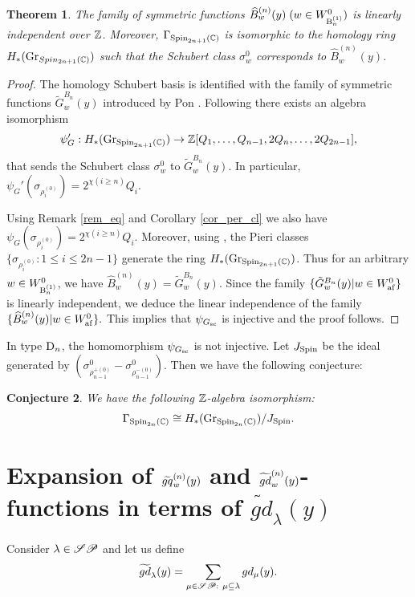 \documentclass[a4paper]{amsart}
\newtheorem{thm}{Theorem}[section]
\newtheorem{conj}[thm]{Conjecture}
\theoremstyle{remark}
\numberwithin{equation}{section}
\begin{document}
\begin{thm}\label{thm_hom_eq}
The family of symmetric functions
${\widehat{B}}_{w}^{(n)}(y)\;(w\in \WBgr{n})$ is linearly independent
over $\Z$. Moreover, $\Gamma_{\Spin_{2n+1}(\C)}$ is isomorphic to the
homology ring $H_*(\Gr_{Spin_{2n+1}(\C)})$
such that the Schubert class $\sigma_{w}^0$
corresponds to ${\widehat{B}}_{w}^{(n)}(y)$.
 \end{thm}
\begin{proof}
The homology Schubert basis 
 is identified with the family of symmetric functions
 $\tilde{G}_w^{B_n}(y)$ introduced by Pon \cite[Section 2.2]{Pon}. Following \cite[Theorem 2.5]{Pon} there exists an algebra isomorphism 
$$\psi_G': H_*(\Gr_{\Spin_{2n+1}(\C)})\to \Z[Q_1,\dots,Q_{n-1},2Q_n,\dots,2Q_{2n-1}],$$
that sends the Schubert class $\sigma_w^0$ to $\tilde{G}_w^{B_n}(y)$. In particular, $\psi_G'(\sigma_{\rho_i^{(0)}})=2^{\chi(i\ge n)}Q_i$. 

Using Remark \ref{rem_eq} and Corollary \ref{cor_per_cl} we also have $\psi_G(\sigma_{\rho_i^{(0)}})=2^{\chi(i\ge n)}Q_i$. Moreover, using \cite[Theorem 2.5]{Pon}, the Pieri classes $\{\sigma_{\rho_i^{(0)}}: 1\le i\le 2n-1\}$ generate the ring $H_*(\Gr_{\Spin_{2n+1}(\C)})$. Thus for an arbitrary $w\in \WBgr{n}$, we have ${\widehat{B}}_w^{(n)}(y)=\tilde{G}_w^{B_n}(y)$. Since the family $\{\tilde{G}_w^{B_n}(y)| w\in \Wafgr\}$ is linearly 
independent, we deduce the linear independence of the family
$\{{\widehat{B}}_{w}^{(n)}(y)| w\in \Wafgr\}.$ This implies that $\psi_{\Gsc}$ is injective and the proof follows.
\end{proof}

In type $\D{n}$, the homomorphism $\psi_{\Gsc}$ is not injective. Let $J_{\Spin}$ be the ideal generated by $(\sigma^0_{\rho_{n-1}^{+(0)}}-\sigma^0_{\rho_{n-1}^{-(0)}})$. Then we have the following conjecture:
\begin{conj}
    We have the following $\Z$-algebra  isomorphism:
    $$\Gamma_{\Spin_{2n}(\C)}\cong {H_*(\Gr_{\Spin_{2n}(\C)})}/{J_{\Spin}}.$$
\end{conj}


\section{Expansion of $\tgq{w}{n}(y)$ and $\tgd{w}{n}(y)$-functions in terms of $\widetilde{gd}_\lambda(y)$}\label{S: expansion}
Consider $\lambda\in \SP$ and let us define $$\widetilde{gd}_{\lambda}(y)=\sum_{\mu\in \SP:~\mu\subseteq\lambda}gd_{\mu}(y).$$
\end{document}
